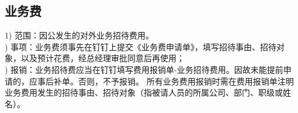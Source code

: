 \documentclass[scheme=plain,UTF8]{ctexart}
\begin{document}


\subsection{业务费}

1)	范围：因公发生的对外业务招待费用。\\)	事项：业务费须事先在钉钉上提交《业务费申请单》，填写招待事由、招待对象，以及预计花费，经总经理审批同意后再使用；\\)	报销：业务招待费应当在钉钉填写费用报销单-业务招待费用。因故未能提前申请的，应事后补单。否则，不予报销。
所有业务费用报销时需在费用报销单注明业务费用发生的招待事由、招待对象（指被请人员的所属公司、部门、职级或姓名）。
\end{document}
